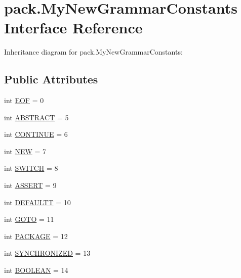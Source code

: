 \hypertarget{interfacepack_1_1_my_new_grammar_constants}{}\section{pack.\+My\+New\+Grammar\+Constants Interface Reference}
\label{interfacepack_1_1_my_new_grammar_constants}


Inheritance diagram for pack.\+My\+New\+Grammar\+Constants\+:
\subsection*{Public Attributes}
\begin{DoxyCompactItemize}
\item 
int \hyperlink{interfacepack_1_1_my_new_grammar_constants_a9a3ca6486cb7e82efdf80605f6cf85f3}{E\+OF} = 0
\item 
int \hyperlink{interfacepack_1_1_my_new_grammar_constants_a3f2c68de8dbc0764434bde50b58b9011}{A\+B\+S\+T\+R\+A\+CT} = 5
\item 
int \hyperlink{interfacepack_1_1_my_new_grammar_constants_aacc1e0ad9532847f7df7b503613ef276}{C\+O\+N\+T\+I\+N\+UE} = 6
\item 
int \hyperlink{interfacepack_1_1_my_new_grammar_constants_a26a1a859fabdbd25a3eb361bebbf578e}{N\+EW} = 7
\item 
int \hyperlink{interfacepack_1_1_my_new_grammar_constants_a2fbb0554ebe6e072914cd766dc744f46}{S\+W\+I\+T\+CH} = 8
\item 
int \hyperlink{interfacepack_1_1_my_new_grammar_constants_aae907714d085746c35a509af9d83f7f7}{A\+S\+S\+E\+RT} = 9
\item 
int \hyperlink{interfacepack_1_1_my_new_grammar_constants_a4edce04fff88e25d214e22f8b8e2621f}{D\+E\+F\+A\+U\+L\+TT} = 10
\item 
int \hyperlink{interfacepack_1_1_my_new_grammar_constants_af19e4cd6c9d385af5656e80b5bcfcc75}{G\+O\+TO} = 11
\item 
int \hyperlink{interfacepack_1_1_my_new_grammar_constants_a24ee37be46c7521c370cdd3fe0d1c21a}{P\+A\+C\+K\+A\+GE} = 12
\item 
int \hyperlink{interfacepack_1_1_my_new_grammar_constants_af1972bfa17823c549c0be01ac34a5187}{S\+Y\+N\+C\+H\+R\+O\+N\+I\+Z\+ED} = 13
\item 
int \hyperlink{interfacepack_1_1_my_new_grammar_constants_a015325ffe3e0580ba2a279bb8454849b}{B\+O\+O\+L\+E\+AN} = 14
\item 

\end{DoxyCompactItemize}

